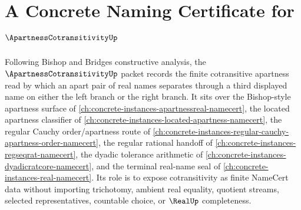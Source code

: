 \chapter{A Concrete Naming Certificate for $\ApartnessCotransitivityUp$}
\label{ch:concrete-instances-apartness-cotransitivity-namecert}

Following Bishop and Bridges constructive analysis, the $\ApartnessCotransitivityUp$ packet records the finite cotransitive apartness read by which an apart pair of real names separates through a third displayed name on either the left branch or the right branch. It sits over the Bishop-style apartness surface of \autoref{ch:concrete-instances-apartnessreal-namecert}, the located apartness classifier of \autoref{ch:concrete-instances-located-apartness-namecert}, the regular Cauchy order/apartness route of \autoref{ch:concrete-instances-regular-cauchy-apartness-order-namecert}, the regular rational handoff of \autoref{ch:concrete-instances-regseqrat-namecert}, the dyadic tolerance arithmetic of \autoref{ch:concrete-instances-dyadicratcore-namecert}, and the terminal real-name seal of \autoref{ch:concrete-instances-real-namecert}. Its role is to expose cotransitivity as finite NameCert data without importing trichotomy, ambient real equality, quotient streams, selected representatives, countable choice, or $\RealUp$ completeness.


